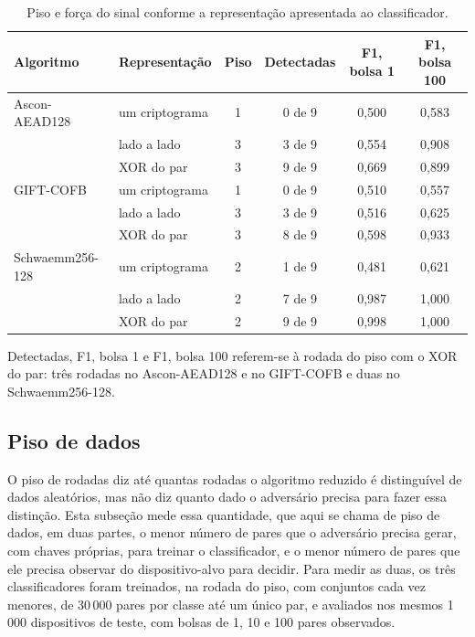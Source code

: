 \begin{table}[htb]
\centering
\caption{Piso e força do sinal conforme a representação apresentada ao classificador.}
\label{tab:res-representacao}
\footnotesize
\setlength{\tabcolsep}{4pt}
\begin{tabular}{llcccc}
\toprule
Algoritmo & Representação & Piso & Detectadas & F1, bolsa 1 & F1, bolsa 100 \\
\midrule
Ascon-AEAD128   & um criptograma & 1 & 0 de 9 & 0,500 & 0,583 \\
                & lado a lado    & 3 & 3 de 9 & 0,554 & 0,908 \\
                & XOR do par     & 3 & 9 de 9 & 0,669 & 0,899 \\
\midrule
GIFT-COFB       & um criptograma & 1 & 0 de 9 & 0,510 & 0,557 \\
                & lado a lado    & 3 & 3 de 9 & 0,516 & 0,625 \\
                & XOR do par     & 3 & 8 de 9 & 0,598 & 0,933 \\
\midrule
Schwaemm256-128 & um criptograma & 2 & 1 de 9 & 0,481 & 0,621 \\
                & lado a lado    & 2 & 7 de 9 & 0,987 & 1,000 \\
                & XOR do par     & 2 & 9 de 9 & 0,998 & 1,000 \\
\bottomrule
\end{tabular}
\par\smallskip\footnotesize Detectadas, F1, bolsa 1 e F1, bolsa 100 referem-se à rodada do piso com o XOR do par: três rodadas no Ascon-AEAD128 e no GIFT-COFB e duas no Schwaemm256-128.
\end{table}

\subsection{Piso de dados}
\label{sec:res-piso-dados}

O piso de rodadas diz até quantas rodadas o algoritmo reduzido é distinguível de dados aleatórios, mas não diz quanto dado o adversário precisa para fazer essa distinção. Esta subseção mede essa quantidade, que aqui se chama de piso de dados, em duas partes, o menor número de pares que o adversário precisa gerar, com chaves próprias, para treinar o classificador, e o menor número de pares que ele precisa observar do dispositivo-alvo para decidir. Para medir as duas, os três classificadores foram treinados, na rodada do piso, com conjuntos cada vez menores, de 30\,000 pares por classe até um único par, e avaliados nos mesmos 1\,000 dispositivos de teste, com bolsas de 1, 10 e 100 pares observados.

